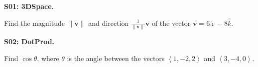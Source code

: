 \documentclass[12pt]{article}
\newcommand{\vect}{\mathbf}
\newcommand{\<}{\left\langle}
\renewcommand{\>}{\right\rangle}
\newcommand{\veci}{\hat{\imath}}
\newcommand{\vecj}{\hat{\jmath}}
\newcommand{\veck}{\hat{k}}
\newcommand{\exerciseHeader}[4]{


  \vspace{0.5em}
  \textbf{#2}
  \vspace{0.5em}

}
\begin{document}
\begin{multicols}{2}

\exerciseHeader{2017 June 01}{S01: 3DSpace.}{
Plot and analyze points and vectors in three-dimensional Euclidean space.
}{1/3}

Find the magnitude \(\|\vect v\|\) and
direction \(\frac{1}{\|\vect v\|}\vect v\)
of the vector \(\vect v = 6\veci-8\veck\).

%

%



\exerciseHeader{2017 June 02}{S02: DotProd.}{
Compute and apply the dot product of two vectors.
}{1/3}

Find \(\cos\theta\), where \(\theta\) is the angle between the vectors
\(\<1,-2,2\>\) and \(\<3,-4,0\>\).

%

%



%

%


\end{multicols}
\end{document}

